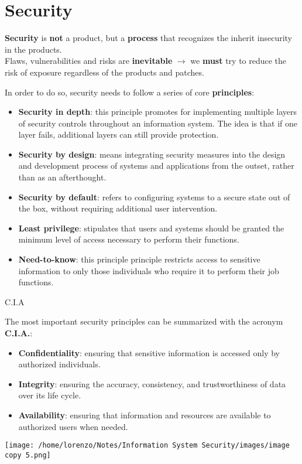 \section{Security}
\begin{quotebox-yellow}{}
\textbf{Security} is \textbf{not} a product, but a \textbf{process} that recognizes the inherit insecurity in the products.\\
Flaws, vulnerabilities and risks are \textbf{inevitable} \(\rightarrow \) we \textbf{must} try to reduce the risk of exposure regardless of the products and patches.
\end{quotebox-yellow}
\noindent
In order to do so, security needs to follow a series of core \textbf{principles}:
\begin{itemize}
    \item \textbf{Security in depth}: this principle promotes for implementing multiple layers of security controls throughout an information system. The idea is that if one layer fails, additional layers can still provide protection. 
    \item \textbf{Security by design}: means integrating security measures into the design and development process of systems and applications from the outset, rather than as an afterthought.
    \item \textbf{Security by default}: refers to configuring systems to a secure state out of the box, without requiring additional user intervention.
    \item \textbf{Least privilege}: stipulates that users and systems should be granted the minimum level of access necessary to perform their functions.
    \item \textbf{Need-to-know}: this principle  principle restricts access to sensitive information to only those individuals who require it to perform their job functions.
\end{itemize}

\begin{quotebox-grey}{C.I.A}
    \begin{minipage}{0.7\textwidth}
        The most important security principles can be summarized with the acronym \textbf{C.I.A.}:
        \begin{itemize}
        \item \textbf{Confidentiality}: ensuring that sensitive information is accessed only by authorized individuals.
        \item \textbf{Integrity}: ensuring the accuracy, consistency, and trustworthiness of data over its life cycle.
        \item \textbf{Availability}: ensuring that information and resources are available to authorized users when needed.    
    \end{itemize}
    \end{minipage} 
    \hspace{0.3cm}
    \begin{minipage}{0.3\textwidth}
        \centering
        \texttt{[image: /home/lorenzo/Notes/Information System Security/images/image copy 5.png]}
    \end{minipage}

\end{quotebox-grey}
